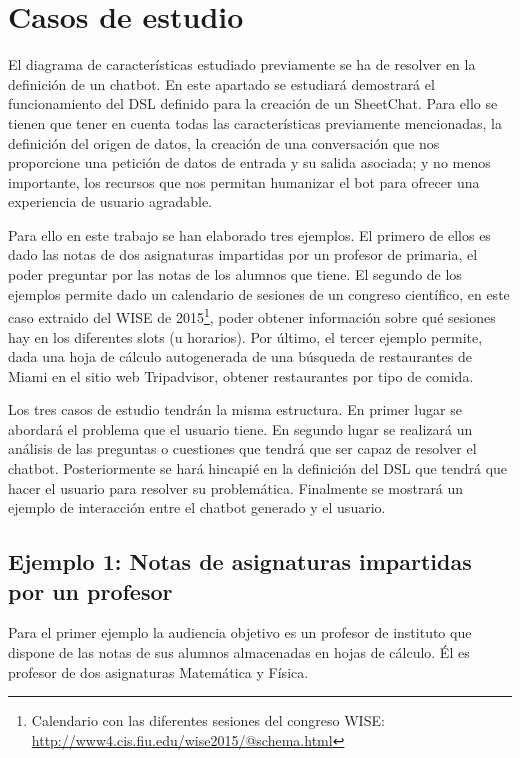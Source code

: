 \chapter{Casos de estudio}

El diagrama de características estudiado previamente se ha de resolver en la definición de un chatbot. En este apartado se estudiará demostrará el funcionamiento del DSL definido para la creación de un SheetChat. Para ello se tienen que tener en cuenta todas las características previamente mencionadas, la definición del origen de datos, la creación de una conversación que nos proporcione una petición de datos de entrada y su salida asociada; y no menos importante, los recursos que nos permitan humanizar el bot para ofrecer una experiencia de usuario agradable.

Para ello en este trabajo se han elaborado tres ejemplos. El primero de ellos es dado las notas de dos asignaturas impartidas por un profesor de primaria, el poder preguntar por las notas de los alumnos que tiene. El segundo de los ejemplos permite dado un calendario de sesiones de un congreso científico, en este caso extraido del WISE de 2015\footnote{Calendario con las diferentes sesiones del congreso WISE: \url{http://www4.cis.fiu.edu/wise2015/@schema.html}}, poder obtener información sobre qué sesiones hay en los diferentes slots (u horarios). Por último, el tercer ejemplo permite, dada una hoja de cálculo autogenerada de una búsqueda de restaurantes de Miami en el sitio web Tripadvisor, obtener restaurantes por tipo de comida.

Los tres casos de estudio tendrán la misma estructura. En primer lugar se abordará el problema que el usuario tiene. En segundo lugar se realizará un análisis de las preguntas o cuestiones que tendrá que ser capaz de resolver el chatbot. Posteriormente se hará hincapié en la definición del DSL que tendrá que hacer el usuario para resolver su problemática. Finalmente se mostrará un ejemplo de interacción entre el chatbot generado y el usuario.

\section{Ejemplo 1: Notas de asignaturas impartidas por un profesor}

Para el primer ejemplo la audiencia objetivo es un profesor de instituto que dispone de las notas de sus alumnos almacenadas en hojas de cálculo. Él es profesor de dos asignaturas Matemática y Física.

